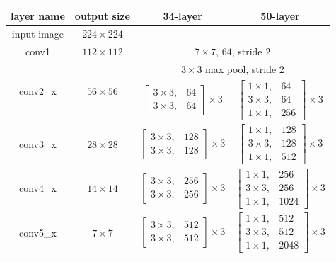 \fi

\iffalse
\begin{table}[]
\centering
\begin{tabular}{ | c | c | c | c | }
\hline
layer name			& output size 					& 34-layer																& 50-layer																			\\ \hline
input image			& $224 \times 224$				& \multicolumn{2}{c|}{}																																	\\ \hline
conv1				& $112 \times112$				& \multicolumn{2}{c|}{$ 7 \times 7$, $64$, stride $2$}																												\\ \hline
\multirow{2}{*}{conv2\_x}	& \multirow{2}{*}{$56 \times 56$} 	& \multicolumn{2}{c|}{$3 \times 3$ max pool, stride $2$}																											\\ \cline{3-4} 
					&							& $\begin{bmatrix} 3 \times 3, &   64 \\ 3 \times 3, &   64 \end{bmatrix} \times 3 $		& $\begin{bmatrix}1 \times 1, & 64 \\ 3 \times 3, & 64 \\ 1 \times 1, & 256 \end{bmatrix}^{} \times 3 $ 		\\ \hline
conv3\_x				& $28 \times 28$				& $\begin{bmatrix} 3 \times 3, & 128 \\ 3 \times 3, & 128 \end{bmatrix} \times 3 $		& $\begin{bmatrix}1 \times 1, & 128 \\ 3 \times 3, & 128 \\ 1 \times 1, & 512 \end{bmatrix} \times 3$		\\ \hline
conv4\_x				& $14 \times 14$				& $\begin{bmatrix} 3 \times 3, & 256 \\ 3 \times 3, & 256 \end{bmatrix} \times 3 $		& $\begin{bmatrix}1 \times 1, & 256 \\ 3 \times 3, & 256 \\ 1 \times 1, & 1024 \end{bmatrix} \times 3$		\\ \hline
conv5\_x				& $  7 \times   7$				& $\begin{bmatrix} 3 \times 3, & 512 \\ 3 \times 3, & 512 \end{bmatrix} \times 3 $		& $\begin{bmatrix}1 \times 1, & 512 \\ 3 \times 3, & 512 \\ 1 \times 1, & 2048 \end{bmatrix} \times 3$		\\ \hline

\end{tabular}
\end{table}
